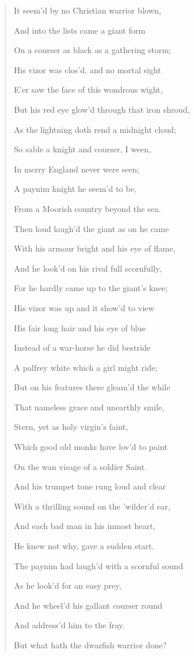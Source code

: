 \begin{quote}
It seem'd by no Christian warrior blown,

And into the lists came a giant form

On a courser as black as a gathering storm;

His vizor was clos'd, and no mortal sight

E'er saw the face of this wondrous wight,

But his red eye glow'd through that iron shroud,

As the lightning doth rend a midnight cloud;

So sable a knight and courser, I ween,

In merry England never were seen;

A paynim knight he seem'd to be,

From a Moorish country beyond the sea.

Then loud laugh'd the giant as on he came

With his armour bright and his eye of flame, 

And he look'd on his rival full scornfully,

For he hardly came up to the giant's knee;

His vizor was up and it show'd to view

His fair long hair and his eye of blue

Instead of a war-horse he did bestride

A palfrey white which a girl might ride;

But on his features there gleam'd the while

That nameless grace and unearthly smile,

Stern, yet as holy virgin's faint,

Which good old monks have lov'd to paint

On the wan visage of a soldier Saint.

And his trumpet tone rung loud and clear

With a thrilling sound on the 'wilder'd ear,

And each bad man in his inmost heart,

He knew not why, gave a sudden start.

The paynim had laugh'd with a scornful sound

As he look'd for an easy prey,

And he wheel'd his gallant courser round

And address'd him to the fray.

But what hath the dwarfish warrior done?


\end{quote}

